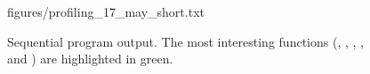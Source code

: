 \begin{figure}[ht]
  \begin{VerbatimInput}{figures/profiling_17_may_short.txt}
    \caption[Sequential program  output.]{Sequential program  output. The most interesting functions (,
    , , , and ) are highlighted in green.}
  \label{fig:sequential_profiler}
\end{VerbatimInput}
\end{figure}

%  

